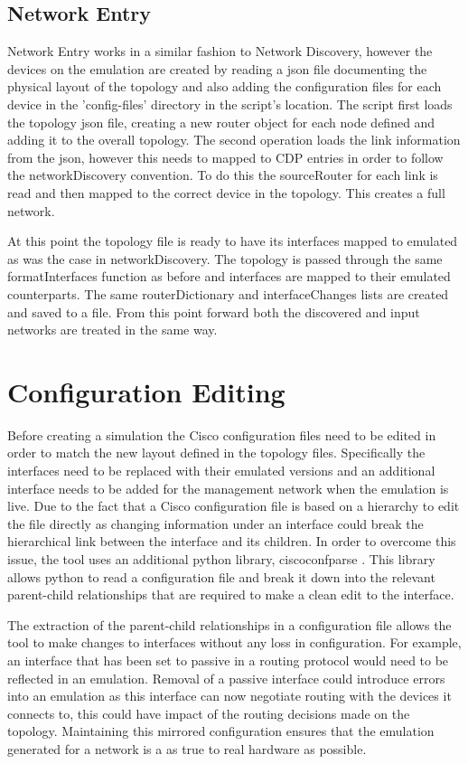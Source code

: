 \documentclass[11pt]{report}
\begin{document}
\subsection{Network Entry}

Network Entry works in a similar fashion to Network Discovery, however the devices on the emulation are created by reading a json file documenting the physical layout of the topology and also adding the configuration files for each device in the 'config-files' directory in the script's location. The script first loads the topology json file, creating a new router object for each node defined and adding it to the overall topology. The second operation loads the link information from the json, however this needs to mapped to CDP entries in order to follow the networkDiscovery convention. To do this the sourceRouter for each link is read and then mapped to the correct device in the topology. This creates a full network.

At this point the topology file is ready to have its interfaces mapped to emulated  as was the case in networkDiscovery. The topology is passed through the same formatInterfaces function as before and interfaces are mapped to their emulated counterparts. The same routerDictionary and interfaceChanges lists are created and saved to a file. From this point forward both the discovered and input networks are treated in the same way. 

\section{Configuration Editing}

Before creating a simulation the Cisco configuration files need to be edited in order to match the new layout defined in the topology files. Specifically the interfaces need to be replaced with their emulated versions and an additional interface needs to be added for the management network when the emulation is live. Due to the fact that a Cisco configuration file is based on a hierarchy to edit the file directly as changing information under an interface could break the hierarchical link between the interface and its children. In order to overcome this issue, the tool uses an additional python library, ciscoconfparse \citep{ciscoconfparse}. This library allows python to read a configuration file and break it down into the relevant parent-child relationships that are required to make a clean edit to the interface.

The extraction of the parent-child relationships in a configuration file allows the tool to make changes to interfaces without any loss in configuration. For example, an interface that has been set to passive in a routing protocol would need to be reflected in an emulation. Removal of a passive interface could introduce errors into an emulation as this interface can now negotiate routing with the devices it connects to, this could have impact of the routing decisions made on the topology. Maintaining this mirrored configuration ensures that the emulation generated for a network is a as true to real hardware as possible.
\end{document}

